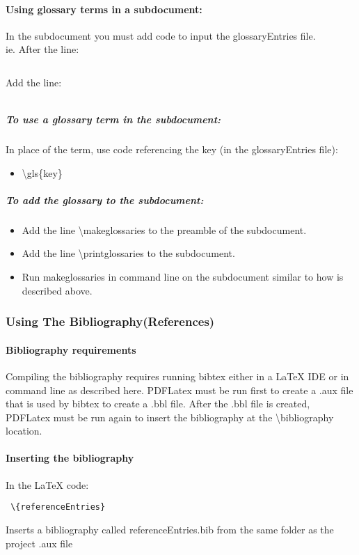 \paragraph{Using glossary terms in a subdocument:}
In the subdocument you must add code to input the glossaryEntries file.\\
ie. After the line:
\begin{verbatim}

\end{verbatim}
Add the line:
\begin{verbatim}

\end{verbatim}
\subparagraph[To use a glossary term]{To use a glossary term in the subdocument:\texorpdfstring{\\}{}}
In place of the term, use code referencing the key (in the glossaryEntries file):
\begin{itemize}
\item \textbackslash gls\{key\}
\end{itemize}
\subparagraph{To add the glossary to the subdocument:}
\begin{itemize}
\item Add the line \textbackslash makeglossaries to the preamble of the subdocument.
\item Add the line \textbackslash printglossaries to the subdocument.
\item Run makeglossaries in command line on the subdocument similar to how is described above.
\end{itemize}
\clearpage

\subsubsection[Using The Bibliography(References)]{{Using The Bibliography(References)}}
\paragraph{Bibliography requirements}
Compiling the bibliography requires running bibtex either in a \LaTeX{} IDE or in command line as described here.  PDFLatex must be run first to create a .aux file that is used by bibtex to create a .bbl file.  After the .bbl file is created, PDFLatex must be run again to insert the bibliography at the \textbackslash bibliography location.
\paragraph{Inserting the bibliography}
In the \LaTeX{} code:
\begin{verbatim} \{referenceEntries}\end{verbatim}
{\smallbtn Inserts a bibliography called referenceEntries.bib from the same folder as the project .aux file}
